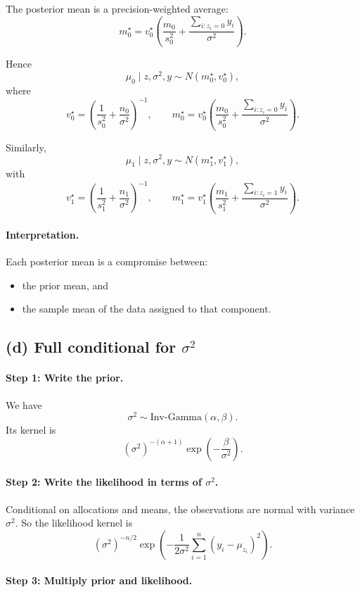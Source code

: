 \documentclass[11pt]{article}
\begin{document}
The posterior mean is a precision-weighted average:
\[
m_0^\star
=
v_0^\star
\left(
\frac{m_0}{s_0^2}
+
\frac{\sum_{i:z_i=0} y_i}{\sigma^2}
\right).
\]

Hence
\[
\boxed{
\mu_0\mid z,\sigma^2,y \sim N(m_0^\star,v_0^\star),
}
\]
where
\[
\boxed{
v_0^\star=
\left(
\frac{1}{s_0^2}
+
\frac{n_0}{\sigma^2}
\right)^{-1},
\qquad
m_0^\star=
v_0^\star
\left(
\frac{m_0}{s_0^2}
+
\frac{\sum_{i:z_i=0} y_i}{\sigma^2}
\right).
}
\]

Similarly,
\[
\boxed{
\mu_1\mid z,\sigma^2,y \sim N(m_1^\star,v_1^\star),
}
\]
with
\[
\boxed{
v_1^\star=
\left(
\frac{1}{s_1^2}
+
\frac{n_1}{\sigma^2}
\right)^{-1},
\qquad
m_1^\star=
v_1^\star
\left(
\frac{m_1}{s_1^2}
+
\frac{\sum_{i:z_i=1} y_i}{\sigma^2}
\right).
}
\]

\paragraph{Interpretation.}  
Each posterior mean is a compromise between:
\begin{itemize}[leftmargin=1.5em]
    \item the prior mean, and
    \item the sample mean of the data assigned to that component.
\end{itemize}

\subsection*{(d) Full conditional for $\sigma^2$}

\paragraph{Step 1: Write the prior.}

We have
\[
\sigma^2\sim \text{Inv-Gamma}(\alpha,\beta).
\]
Its kernel is
\[
(\sigma^2)^{-(\alpha+1)}\exp\left(-\frac{\beta}{\sigma^2}\right).
\]

\paragraph{Step 2: Write the likelihood in terms of $\sigma^2$.}

Conditional on allocations and means, the observations are normal with variance $\sigma^2$.
So the likelihood kernel is
\[
(\sigma^2)^{-n/2}
\exp\left(
-\frac{1}{2\sigma^2}\sum_{i=1}^n (y_i-\mu_{z_i})^2
\right).
\]

\paragraph{Step 3: Multiply prior and likelihood.}
\end{document}

